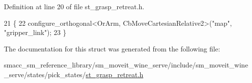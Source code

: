 Definition at line 20 of file st\+\_\+grasp\+\_\+retreat.\+h.


\begin{DoxyCode}
21     \{
22         configure\_orthogonal<OrArm, CbMoveCartesianRelative2>(\textcolor{stringliteral}{"map"}, \textcolor{stringliteral}{"gripper\_link"});
23     \}
\end{DoxyCode}


The documentation for this struct was generated from the following file\+:\begin{DoxyCompactItemize}
\item 
smacc\+\_\+sm\+\_\+reference\+\_\+library/sm\+\_\+moveit\+\_\+wine\+\_\+serve/include/sm\+\_\+moveit\+\_\+wine\+\_\+serve/states/pick\+\_\+states/\hyperlink{sm__moveit__wine__serve_2include_2sm__moveit__wine__serve_2states_2pick__states_2st__grasp__retreat_8h}{st\+\_\+grasp\+\_\+retreat.\+h}\end{DoxyCompactItemize}
